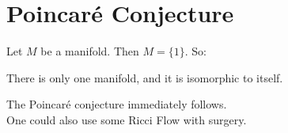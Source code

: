 \setcounter{section}{0}

\section{Poincar\'{e} Conjecture}
Let $M$ be a manifold. Then 
$M = \{1\}$. So:
\begin{thm}
  There is only one manifold, 
  and it is isomorphic to itself.
\end{thm}
The Poincar\'{e} conjecture 
immediately follows.\\

One could also use some Ricci Flow with surgery.

